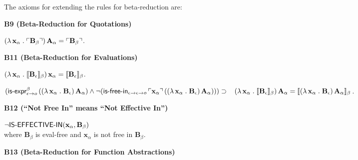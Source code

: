 \documentclass[fleqn]{llncs}
\begin{document}
\medskip

\noindent
The axioms for extending the rules  for beta-reduction are:

\medskip

\noindent
\begin{minipage}{\textwidth}
  \noindent\textbf{B9 (Beta-Reduction for Quotations)}

  \be

    \item[] $(\lambda\, \textbf{x}_\alpha \mathrel.
      \ulcorner\textbf{B}_\beta\urcorner) \, \textbf{A}_\alpha =
      \ulcorner\textbf{B}_\beta\urcorner$.

  \ee

  \noindent\textbf{B11 (Beta-Reduction for Evaluations)}
  \be

    \item $(\lambda\, \textbf{x}_\alpha \mathrel.
      \llbracket\textbf{B}_\epsilon\rrbracket_\beta) \, \textbf{x}_\alpha =
      \llbracket\textbf{B}_\epsilon\rrbracket_\beta$.
 
    \item $(\mname{is-expr}_{\epsilon \tarrow o}^{\beta} \,
      ((\LambdaApp \textbf{x}_\alpha \mdot \textbf{B}_\epsilon) \,
      \textbf{A}_\alpha) \And %
      \Neg(\mname{is-free-in}_{\epsilon \tarrow \epsilon \tarrow o}
      \, \synbrack{\textbf{x}_\alpha} \, ((\LambdaApp
      \textbf{x}_\alpha \mdot \textbf{B}_\epsilon) \,
      \textbf{A}_\alpha))) \Implies \\[.5ex]
      \hspace*{2ex} (\LambdaApp \textbf{x}_\alpha \mdot
      \sembrack{\textbf{B}_\epsilon}_\beta) \, \textbf{A}_\alpha =
      \sembrack{(\LambdaApp \textbf{x}_\alpha \mdot
        \textbf{B}_\epsilon) \, \textbf{A}_\alpha}_\beta$.

  \ee

  \noindent\textbf{B12 (``Not Free In'' means ``Not Effective In'')}

  \bi

    \item[] $\neg\mbox{\sf IS-EFFECTIVE-IN}(\textbf{x}_\alpha,\textbf{B}_\beta)$\\
      where $\textbf{B}_\beta$ is eval-free and
      $\textbf{x}_\alpha$ is not free in $\textbf{B}_\beta$.

  \ei

  \noindent\textbf{B13 (Beta-Reduction for Function Abstractions)}

  \bi


\end{minipage}
\end{document}
